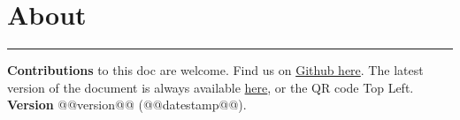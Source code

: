 \section{About}
\hrule

\medskip

\textbf{Contributions} to this doc are welcome. Find us on \href{https://github.com/robert-will-brown/video-streaming-cheatsheet}{Github here}.
The latest version of the document is always available \href{https://bit.ly/3p1Omqh}{here}, or the QR code Top Left.
\textbf{Version} @@version@@ (@@datestamp@@).

